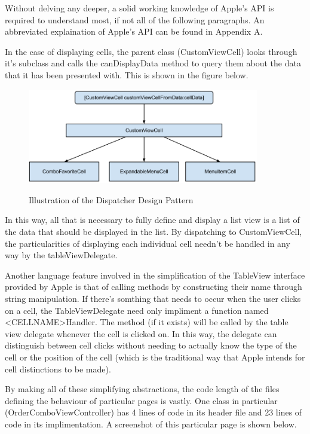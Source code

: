 \documentclass[se]{uw-wkrpt}
\begin{document}
Without delving any deeper, a solid working knowledge of Apple's API is required to understand
most, if not all of the following paragraphs. An abbreviated explaination of Apple's API can 
be found in Appendix A.

In the case of displaying cells, the parent class (CustomViewCell) looks through it's subclass
and calls the canDisplayData method to query them about the data that it has been presented with.
This is shown in the figure below.

\begin{figure}[h!]
  \caption{Illustration of the Dispatcher Design Pattern}
  \centering
    \includegraphics[width=0.9\textwidth]{customViewCellFlowchart}
  \label{fig:Dispatcher Pattern}
\end{figure}

In this way, all that is necessary to fully define and display a list view is a list of the data
that should be displayed in the list. By dispatching to CustomViewCell, the particularities of
displaying each individual cell needn't be handled in any way by the tableViewDelegate. 

Another language feature involved in the simplification of the TableView interface provided
by Apple is that of calling methods by constructing their name through string manipulation.
If there's somthing that needs to occur when the user clicks on a cell, the TableViewDelegate
need only impliment a function named <CELLNAME>Handler. The method (if it exists) will be called
by the table view delegate whenever the cell is clicked on. In this way, the delegate can 
distinguish between cell clicks without needing to actually know the type of the cell or the
position of the cell (which is the traditional way that Apple intends for cell distinctions to
be made). 

By making all of these simplifying abstractions, the code length of the files defining
the behaviour of particular pages is vastly. One class in particular (OrderComboViewController)
has 4 lines of code in its header file and 23 lines of code in its implimentation. A screenshot
of this particular page is shown below. 
\end{document}
